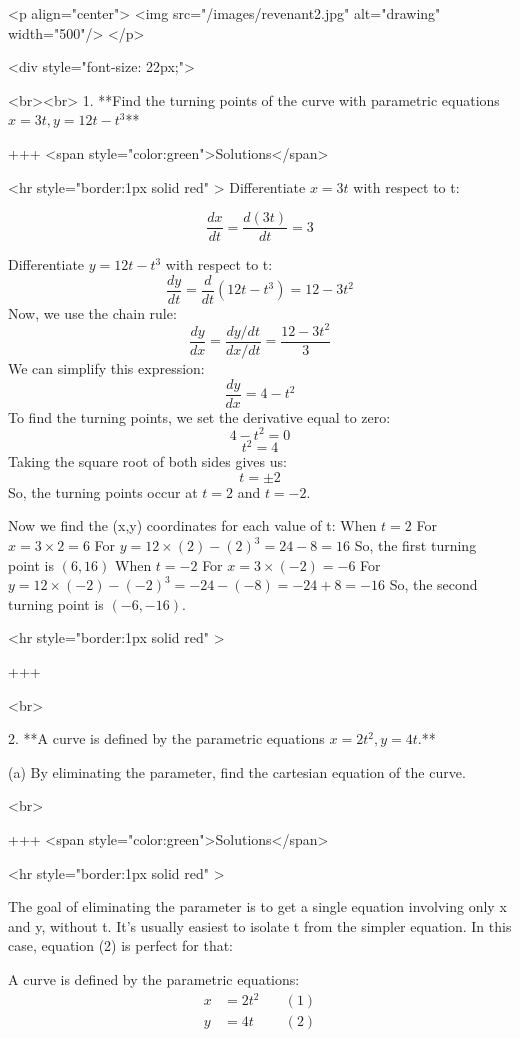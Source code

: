 <p align="center">
<img src="/images/revenant2.jpg" alt="drawing" width="500"/>
</p>

<div style="font-size: 22px;">

<br><br>
1. **Find the turning points of the curve with parametric equations $x=3 t, y=12 t-t^{3}$**

+++ <span style="color:green">Solutions</span>

<hr style="border:1px solid red" >
Differentiate $x=3t$ with respect to t:

$$
\frac{dx}{dt} = \frac{d(3t)}{dt} = 3
$$

Differentiate $y=12t−t^3$ with respect to t:
$$
\frac{dy}{dt} = \frac{d}{dt}(12t - t^3) = 12 - 3t^2
$$
Now, we use the chain rule:
$$
\frac{dy}{dx} = \frac{dy/dt}{dx/dt} = \frac{12 - 3t^2}{3}
$$
We can simplify this expression:
$$
\frac{dy}{dx} = 4 - t^2
$$
To find the turning points, we set the derivative equal to zero:
$$
4 - t^2 = 0
$$
$$
t^2 = 4
$$
Taking the square root of both sides gives us:
$$
t = \pm 2
$$
So, the turning points occur at $t=2$ and $t=−2$.

Now we find the (x,y) coordinates for each value of t:
When $t=2$
For $x=3\times 2=6$
For $y=12 \times (2)−(2)^3 =24−8=16$
So, the first turning point is $(6,16)$
When $t=−2$
For $x=3\times(−2)=−6$
For $y=12\times(−2)−(−2)^3=−24−(−8)=−24+8=−16$
So, the second turning point is $(−6,−16)$.

<hr style="border:1px solid red" >

+++

<br>

2. **A curve is defined by the parametric equations $x=2 t^{2}, y=4 t$.**

(a) By eliminating the parameter, find the cartesian equation of the curve.

<br>

+++ <span style="color:green">Solutions</span>

<hr style="border:1px solid red" >

The goal of eliminating the parameter is to get a single equation involving only x and y, without t. It's usually easiest to isolate t from the simpler equation. In this case, equation (2) is perfect for that:

A curve is defined by the parametric equations:
\begin{align*} x &= 2t^2 \quad &(1) \\ y &= 4t \quad &(2)\end{align*}

